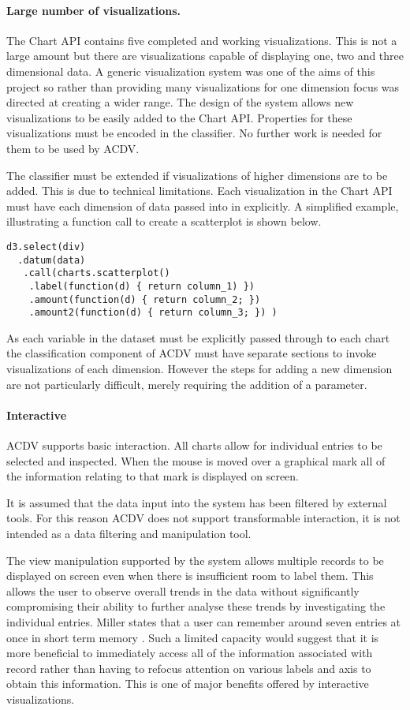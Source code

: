 \documentclass[a4paper, 11pt, titlepage, onehalfspacing]{report}
\begin{document}
\paragraph{Large number of visualizations.} The Chart API contains five completed and working visualizations. This is not a large amount but there are visualizations capable of displaying one, two and three dimensional data. A generic visualization system was one of the aims of this project so rather than providing many visualizations for one dimension focus was directed at creating a wider range. The design of the system allows new visualizations to be easily added to the Chart API. Properties for these visualizations must be encoded in the classifier. No further work is needed for them to be used by AC\lightning{}DV. 

The classifier must be extended if visualizations of higher dimensions are to be added. This is due to technical limitations. Each visualization in the Chart API must have each dimension of data passed into in explicitly. A simplified example, illustrating a function call to create a scatterplot is shown below.
\begin{verbatim}
d3.select(div)
  .datum(data)
   .call(charts.scatterplot()
    .label(function(d) { return column_1) })
    .amount(function(d) { return column_2; }) 
    .amount2(function(d) { return column_3; }) )
\end{verbatim}
As each variable in the dataset must be explicitly passed through to each chart the classification component of AC\lightning{}DV must have separate sections to invoke visualizations of each dimension. However the steps for adding a new dimension are not particularly difficult, merely requiring the addition of a parameter.

\paragraph{Interactive} AC\lightning{}DV supports basic interaction. All charts allow for individual entries to be selected and inspected. When the mouse is moved over a graphical mark all of the information relating to that mark is displayed on screen. 

It is assumed that the data input into the system has been filtered by external tools. For this reason AC\lightning{}DV does not support transformable interaction, it is not intended as a data filtering and manipulation tool.

The view manipulation supported by the system allows multiple records to be displayed on screen even when there is insufficient room to label them. This allows the user to observe overall trends in the data without significantly compromising their ability to further analyse these trends by investigating the individual entries. Miller states that a user can remember around seven entries at once in short term memory \cite{Mil56}. Such a limited capacity would suggest that it is more beneficial to immediately access all of the information associated with record rather than having to refocus attention on various labels and axis to obtain this information. This is one of major benefits offered by interactive visualizations. 
\end{document}
